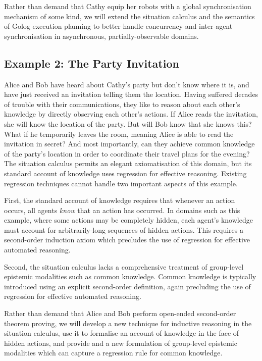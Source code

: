 Rather than demand that Cathy equip her robots with a global synchronisation
mechanism of some kind, we will extend the situation calculus and
the semantics of Golog execution planning to better handle concurrency
and inter-agent synchronisation in asynchronous, partially-observable
domains.


\subsection*{Example 2: The Party Invitation}

Alice and Bob have heard about Cathy's party but don't know where
it is, and have just received an invitation telling them the location.
Having suffered decades of trouble with their communications, they
like to reason about each other's knowledge by directly observing
each other's actions. If Alice reads the invitation, she will know
the location of the party. But will Bob know that she knows this?
What if he temporarily leaves the room, meaning Alice is able to read
the invitation in secret? And most importantly, can they achieve common
knowledge of the party's location in order to coordinate their travel
plans for the evening?\\


The situation calculus permits an elegant axiomatisation of this domain,
but its standard account of knowledge uses regression for effective
reasoning. Existing regression techniques cannot handle two important
aspects of this example.

First, the standard account of knowledge requires that whenever an
action occurs, all agents \emph{know} that an action has occurred.
In domains such as this example, where some actions may be completely
hidden, each agent's knowledge must account for arbitrarily-long sequences
of hidden actions. This requires a second-order induction axiom which
precludes the use of regression for effective automated reasoning.

Second, the situation calculus lacks a comprehensive treatment of
group-level epistemic modalities such as common knowledge. Common
knowledge is typically introduced using an explicit second-order definition,
again precluding the use of regression for effective automated reasoning.

Rather than demand that Alice and Bob perform open-ended second-order
theorem proving, we will develop a new technique for inductive reasoning
in the situation calculus, use it to formalise an account of knowledge
in the face of hidden actions, and provide and a new formulation of
group-level epistemic modalities which can capture a regression rule
for common knowledge.


